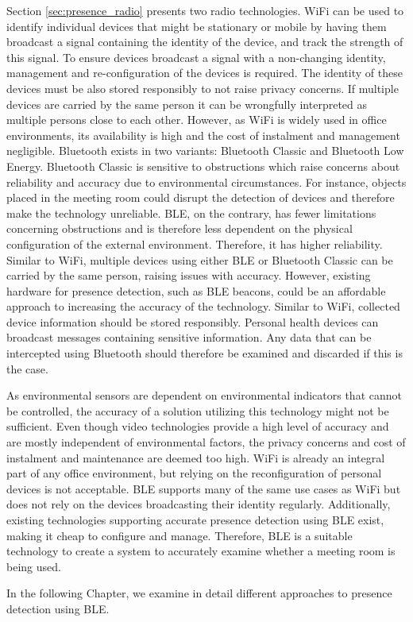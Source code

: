 Section \ref{sec:presence_radio} presents two radio technologies. 
WiFi can be used to identify individual devices that might be stationary or mobile by having them broadcast a signal containing the identity of the device, and track the strength of this signal.
To ensure devices broadcast a signal with a non-changing identity,  management and re-configuration of the devices is required.
The identity of these devices must be also stored responsibly to not raise privacy concerns.
If multiple devices are carried by the same person it can be wrongfully interpreted as multiple persons close to each other. 
However, as WiFi is widely used in office environments, its availability is high and the cost of instalment and management negligible.
Bluetooth exists in two variants: Bluetooth Classic and Bluetooth Low Energy.
Bluetooth Classic is sensitive to obstructions which raise concerns about reliability and accuracy due to environmental circumstances. 
For instance, objects placed in the meeting room could disrupt the detection of devices and therefore make the technology unreliable.
BLE, on the contrary, has fewer limitations concerning obstructions and is therefore less dependent on the physical configuration of the external environment. 
Therefore, it has higher reliability.
Similar to WiFi, multiple devices using either BLE or Bluetooth Classic can be carried by the same person, raising issues with accuracy.
However, existing hardware for presence detection, such as BLE beacons, could be an affordable approach to increasing the accuracy of the technology.  
Similar to WiFi, collected device information should be stored responsibly.
Personal health devices can broadcast messages containing sensitive information.
Any data that can be intercepted using Bluetooth should therefore be examined and discarded if this is the case.

As environmental sensors are dependent on environmental indicators that cannot be controlled, the accuracy of a solution utilizing this technology might not be sufficient.
Even though video technologies provide a high level of accuracy and are mostly independent of environmental factors, the privacy concerns and cost of instalment and maintenance are deemed too high.
WiFi is already an integral part of any office environment, but relying on the reconfiguration of personal devices is not acceptable. 
BLE supports many of the same use cases as WiFi but does not rely on the devices broadcasting their identity regularly.
Additionally, existing technologies supporting accurate presence detection using BLE exist, making it cheap to configure and manage. 
Therefore, BLE is a suitable technology to create a system to accurately examine whether a meeting room is being used.

In the following Chapter, we examine in detail different approaches to presence detection using BLE.